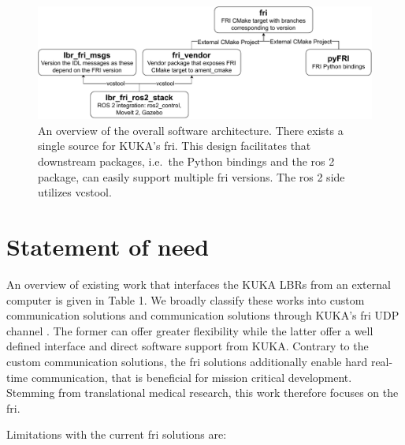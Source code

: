 \begin{figure}
\centering
\includegraphics[width=\textwidth]{appendix_a/img/fri_dependency_architecture.pdf}
\caption[An overview of the overall software architecture. There exists
a single source for KUKA's \acrshort{fri}. This design facilitates that downstream
packages, i.e.~the Python bindings and the \acrshort{ros} 2 package, can easily
support multiple \acrshort{fri} versions. The \acrshort{ros} 2 side utilizes
vcstool.\label{fig:fri}]{An overview of the overall software
architecture. There exists a single source for KUKA's \acrshort{fri}. This design
facilitates that downstream packages, i.e.~the Python bindings and the
\acrshort{ros} 2 package, can easily support multiple \acrshort{fri} versions. The \acrshort{ros} 2 side
utilizes vcstool\footnotemark{}.\label{fig:fri}}
\end{figure}

\hypertarget{statement-of-need}{%
\section{Statement of need}\label{statement-of-need}}

An overview of existing work that interfaces the KUKA LBRs from an
external computer is given in Table 1. We broadly classify these works
into custom communication solutions
\cite{ref-iiwa_stack,ref-kuka_sunrise_toolbox,ref-libiiwa} and
communication solutions through KUKA's \acrshort{fri} UDP channel 
\cite{ref-iiwa_ros2,ref-iiwa_ros}. The
former can offer greater flexibility while the latter offer a well
defined interface and direct software support from KUKA. Contrary to the
custom communication solutions, the \acrshort{fri} solutions additionally enable
hard real-time communication, that is beneficial for mission critical
development. Stemming from translational medical research, this work
therefore focuses on the \acrshort{fri}.

Limitations with the current \acrshort{fri} solutions are:

